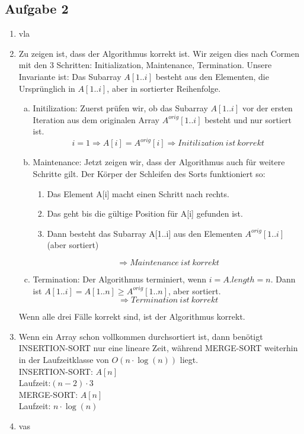 \documentclass[a4paper,fleqn]{scrartcl}
\begin{document}
\subsection*{Aufgabe 2}
\begin{enumerate}[1.]
\item vla
\item Zu zeigen ist, dass der Algorithmus korrekt ist. Wir zeigen dies nach
Cormen mit den 3 Schritten: Initialization, Maintenance, Termination.
Unsere Invariante ist: Das Subarray \(A[1..i]\) besteht aus den Elementen, die
Ursprünglich in \(A[1..i]\), aber in sortierter Reihenfolge.
\begin{enumerate}[(a)]
\item Initilization: Zuerst prüfen wir, ob das Subarray \(A[1..i]\) vor der
ersten Iteration aus dem originalen Array \(A^{orig}[1..i]\) besteht und
nur sortiert ist.
\[i = 1 \Rightarrow A[i] = A^{orig}[i] \Rightarrow Initilization\ ist\ korrekt\]
\item Maintenance: Jetzt zeigen wir, dass der Algorithmus auch für weitere Schritte gilt.
Der Körper der Schleifen des Sorts funktioniert so:
\begin{enumerate}
\item Das Element A[i] macht einen Schritt nach rechts.
\item Das geht bis die gültige Position für A[i] gefunden ist.
\item Dann besteht das Subarray A[1..i] aus den Elementen \(A^{orig}[1..i]\) (aber sortiert)
\end{enumerate}
\[\Rightarrow Maintenance\ ist\ korrekt\]
\item Termination: Der Algorithmus terminiert, wenn \(i=A.length = n\).
Dann ist \(A[1..i] = A[1..n] \geq A^{orig}[1..n]\), aber sortiert.
\[\Rightarrow Termination\ ist\ korrekt\]
\end{enumerate}
Wenn alle drei Fälle korrekt sind, ist der Algorithmus korrekt.

\item
Wenn ein Array schon vollkommen durchsortiert ist, dann benötigt INSERTION-SORT nur eine lineare Zeit, während MERGE-SORT weiterhin in der Laufzeitklasse von $O\left(n \cdot \log(n)\right)$ liegt. \\
INSERTION-SORT: $A[n]$ \\
Laufzeit:$(n-2)\cdot 3$ \\
MERGE-SORT: $A[n]$ \\
Laufzeit: $n\cdot \log(n)$
\item vas 
\end{enumerate}
\end{document}
